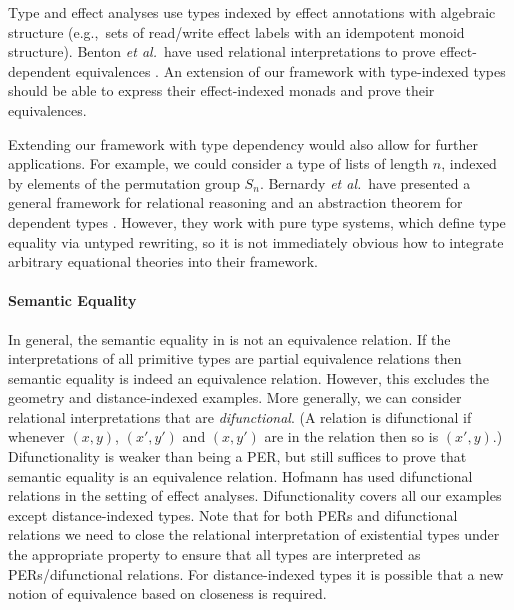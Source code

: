 Type and effect analyses use types indexed by effect annotations with
algebraic structure (e.g.,~sets of read/write effect labels with an
idempotent monoid structure). Benton {\em et al.}~have used relational
interpretations to prove effect-dependent equivalences
\cite{benton06reading}. An extension of our framework with
type-indexed types should be able to express their effect-indexed monads
and prove their equivalences.

Extending our framework with type dependency would also allow for
further applications. For example, we could consider a type of lists
of length $n$, indexed by elements of the permutation group
$S_n$. Bernardy {\em et al.}~have presented a general framework for
relational reasoning and an abstraction theorem for dependent types
\cite{bernardy12proofs}. However, they work with pure type systems,
which define type equality via untyped rewriting, so it is not
immediately obvious how to integrate arbitrary equational theories
into their framework.

\paragraph{Semantic Equality} In general, the semantic equality
in  is not an
equivalence relation. If the interpretations of all 
primitive types are partial equivalence relations then semantic
equality is indeed an equivalence relation. However, this excludes the
geometry and distance-indexed examples. More generally, we can
consider relational interpretations that are \emph{difunctional}. (A
relation is difunctional if whenever $(x,y)$, $(x',y')$ and $(x,y')$
are in the relation then so is $(x',y)$.) Difunctionality is weaker
than being a PER, but still suffices to prove that semantic equality
is an equivalence relation. Hofmann \cite{hofmann08correctness} has
used difunctional relations in the setting of effect
analyses. Difunctionality covers all our examples except
distance-indexed types. Note that for both PERs and difunctional
relations we need to close the relational interpretation of
existential types under the appropriate property to ensure that all
types are interpreted as PERs/difunctional relations. For
distance-indexed types it is possible that a new notion of
equivalence based on closeness is required.

